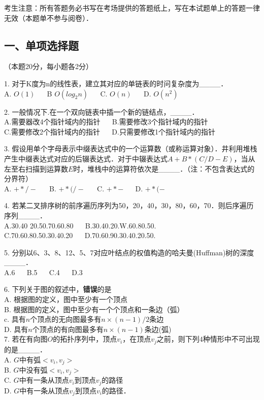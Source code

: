 

考生注意：所有答题务必书写在考场提供的答题纸上，写在本试题单上的答题一律无效（本题单不参与阅卷）．

\subsection{一、单项选择题}
（本题20分，每小题各2分）

1. 对于K度为n的线性表，建立其对应的单链表的时问复杂度为____． \\
A. $O(1)$ $\quad$ B $O(log_2n)$ $\quad$ C. $O(n)$ $\quad$ D. $O(n^2)$

2. 一般情况下.在一个双向链表中插一个新的链结点，____． \\
A.需要器改4个指针域内的指针 $\quad$ B.需要修改3个指针域内的指针 \\
C.需要修改2个指针域内的指针 $\quad$ D.只需要修改1个指针域内的指针

3. 假设用单个字母表示中缀表达式中的一个运算数（或称运算对象）．井利用堆栈产生中缀表达式对应的后辍表达式．对于中辍表达式$A+B*(C/D-E)$，当从左至右扫描到运算数$E$时，堆栈中的运算符依次是____．（注：不包含表达式的分界符） \\
A. $+*/-$  $\quad$  B. $+*(/-$ $\quad$  C. $+*-$ $\quad$ D. $+*(-$

4. 若某二叉排序树的前序遍历序列为50，20，40，30，80，60，70．则后序遍历序列____． \\
A.30.40 20.50.70.60.80 $\quad$ B.30.40.20.W.60.80.50. \\
C.70.60.80.50.30.40.20 $\quad$ D.70.60.90.30.40.20.50.

5. 分别以6、3、8、12、5、7对应叶结点的权值构造的哈夫曼(Huffman)树的深度____． \\
A.6  $\quad$ B.5 $\quad$ C.4 $\quad$ D.3

6. 下列关于图的叙述中，\textbf{错误}的是 \\
A. 根据图的定义，图中至少有一个顶点 \\
B. 根据图的定义，图中至少有一个个顶点和一条边（弧） \\
c. 具有$n$个顶点的无向图最多有$n\times(n-1)/2$条边 \\
D. 具有$n$个顶点的有向图最多有$n\times(n-1)$条边(弧) \\

7. 若在有向图$O$的拓扑序列中，顶点$v_i$，在顶点$v_j$之前，则下列$4$种情形中不可出现的是____． \\
A. $G$中有弧$<v_i,v_j>$ \\
B. $G$中没有弧$<v_i,v_j>$ \\
C. $G$中有一条从顶点$v_i$到顶点$v_j$的路径 \\
D. $G$中有一条从顶点$v_j$到顶点$v_i$的路径．

